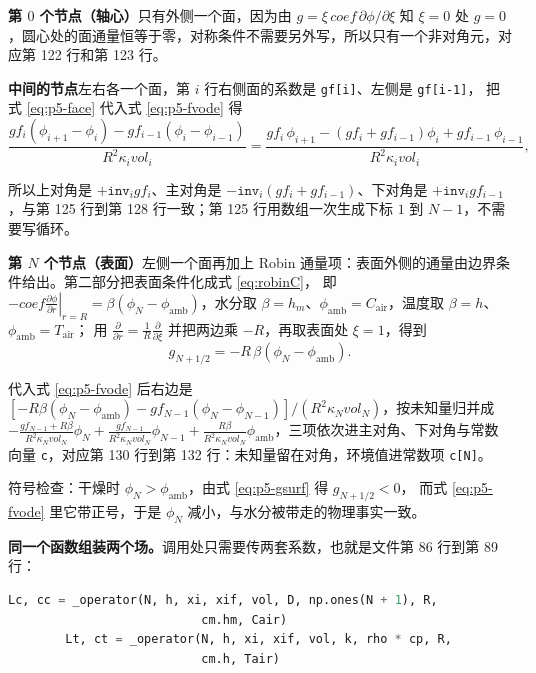 \textbf{第 $0$ 个节点（轴心）}只有外侧一个面，因为由 $g=\xi\,coef\,\partial\phi/\partial\xi$ 知 $\xi=0$ 处 $g=0$，圆心处的面通量恒等于零，对称条件不需要另外写，所以只有一个非对角元，对应第 122 行和第 123 行。

\textbf{中间的节点}左右各一个面，第 $i$ 行右侧面的系数是 \texttt{gf[i]}、左侧是 \texttt{gf[i-1]}，
把式 \eqref{eq:p5-face} 代入式 \eqref{eq:p5-fvode} 得
\begin{equation}
\frac{gf_i\left(\phi_{i+1}-\phi_i\right)-gf_{i-1}\left(\phi_i-\phi_{i-1}\right)}{R^2\kappa_ivol_i}
=\frac{gf_i\,\phi_{i+1}-\left(gf_i+gf_{i-1}\right)\phi_i+gf_{i-1}\,\phi_{i-1}}{R^2\kappa_ivol_i},
\end{equation}

所以上对角是 $+\texttt{inv}_igf_i$、主对角是 $-\texttt{inv}_i(gf_i+gf_{i-1})$、下对角是 $+\texttt{inv}_igf_{i-1}$，与第 125 行到第 128 行一致；第 125 行用数组一次生成下标 $1$ 到 $N-1$，不需要写循环。

\textbf{第 $N$ 个节点（表面）}左侧一个面再加上 Robin 通量项：表面外侧的通量由边界条件给出。第二部分把表面条件化成式 \eqref{eq:robinC}，
即 $-coef\left.\frac{\partial\phi}{\partial r}\right|_{r=R}=\beta\left(\phi_N-\phi_{\text{amb}}\right)$，水分取 $\beta=h_m$、$\phi_{\text{amb}}=C_{\text{air}}$，温度取 $\beta=h$、$\phi_{\text{amb}}=T_{\text{air}}$；
用 $\frac{\partial}{\partial r}=\frac1R\frac{\partial}{\partial\xi}$ 并把两边乘 $-R$，再取表面处 $\xi=1$，得到
\begin{equation}
g_{N+1/2}=-R\,\beta\left(\phi_N-\phi_{\text{amb}}\right).
\label{eq:p5-gsurf}
\end{equation}

代入式 \eqref{eq:p5-fvode} 后右边是 $\left[-R\beta\left(\phi_N-\phi_{\text{amb}}\right)-gf_{N-1}\left(\phi_N-\phi_{N-1}\right)\right]/\left(R^2\kappa_Nvol_N\right)$，按未知量归并成
$-\frac{gf_{N-1}+R\beta}{R^2\kappa_Nvol_N}\phi_N+\frac{gf_{N-1}}{R^2\kappa_Nvol_N}\phi_{N-1}+\frac{R\beta}{R^2\kappa_Nvol_N}\phi_{\text{amb}}$，三项依次进主对角、下对角与常数向量 \texttt{c}，对应第 130 行到第 132 行：未知量留在对角，环境值进常数项 \texttt{c[N]}。

符号检查：干燥时 $\phi_N>\phi_{\text{amb}}$，由式 \eqref{eq:p5-gsurf} 得 $g_{N+1/2}<0$，
而式 \eqref{eq:p5-fvode} 里它带正号，于是 $\phi_N$ 减小，与水分被带走的物理事实一致。

\textbf{同一个函数组装两个场。}调用处只需要传两套系数，也就是文件第 86 行到第 89 行：

\begin{lstlisting}[language=Python]
        Lc, cc = _operator(N, h, xi, xif, vol, D, np.ones(N + 1), R,
                           cm.hm, Cair)
        Lt, ct = _operator(N, h, xi, xif, vol, k, rho * cp, R,
                           cm.h, Tair)
\end{lstlisting}

